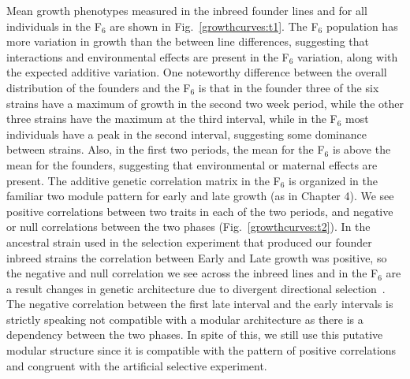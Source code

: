 \begin{refsection}
Mean growth phenotypes measured in the inbreed founder lines and for all
individuals in the F$_{\text{6}}$ are shown in Fig.~\ref{growthcurves:t1}. The
F$_{\text{6}}$ population has more variation in growth than the between line
differences, suggesting that interactions and environmental effects are
present in the F$_{\text{6}}$ variation, along with the expected additive
variation. One noteworthy difference between the overall distribution of the
founders and the F$_{\text{6}}$ is that in the founder three of the six
strains have a maximum of growth in the second two week period, while the
other three strains have the maximum at the third interval, while in the
F$_{\text{6}}$ most individuals have a peak in the second interval, suggesting
some dominance between strains. Also, in the first two periods, the mean for
the F$_{\text{6}}$ is above the mean for the founders, suggesting that
environmental or maternal effects are present. The additive genetic
correlation matrix in the F$_{\text{6}}$ is organized in the familiar two
module pattern for early and late growth (as in Chapter 4). We see positive
correlations between two traits in each of the two periods, and negative or
null correlations between the two phases (Fig.~\ref{growthcurves:t2}). In the
ancestral strain used in the selection experiment that produced our founder
inbreed strains the correlation between Early and Late growth was positive, so
the negative and null correlation we see across the inbreed lines and in the
F$_{\text{6}}$ are a result changes in genetic architecture due to divergent
directional selection~\parencite{Atchley1997-vn}. The negative correlation
between the first late interval and the early intervals is strictly speaking
not compatible with a modular architecture as there is a dependency between
the two phases. In spite of this, we still use this putative modular structure
since it is compatible with the pattern of positive correlations and congruent
with the artificial selective experiment.


\end{refsection}
